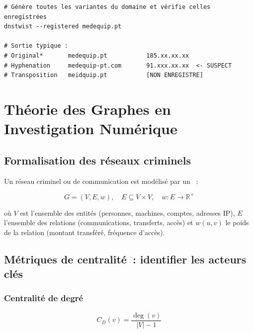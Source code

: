 \begin{lstlisting}[language=bash_forensique,
    caption={Détection de typosquatting avec dnstwist}]
# Génère toutes les variantes du domaine et vérifie celles enregistrées
dnstwist --registered medequip.pt

# Sortie typique :
# Original*       medequip.pt           185.xx.xx.xx
# Hyphenation     medequip-pt.com       91.xxx.xx.xx  <- SUSPECT
# Transposition   meidquip.pt           [NON ENREGISTRE]
\end{lstlisting}

\section{Théorie des Graphes en Investigation Numérique}
\label{sec:graphes}

\subsection{Formalisation des réseaux criminels}

Un réseau criminel ou de communication est modélisé par un
~:

\begin{equation}
G = (V, E, w), \quad
E \subseteq V \times V, \quad
w : E \to \mathbb{R}^+
\label{eq:graphe-pondere}
\end{equation}

où $V$ est l'ensemble des entités (personnes, machines, comptes, adresses IP),
$E$ l'ensemble des relations (communications, transferts, accès) et $w(u,v)$
le poids de la relation (montant transféré, fréquence d'accès).

\subsection{Métriques de centralité~: identifier les acteurs clés}

\subsubsection{Centralité de degré}

\begin{equation}
C_D(v) = \frac{\deg(v)}{|V| - 1}
\label{eq:centralite-degre}
\end{equation}

